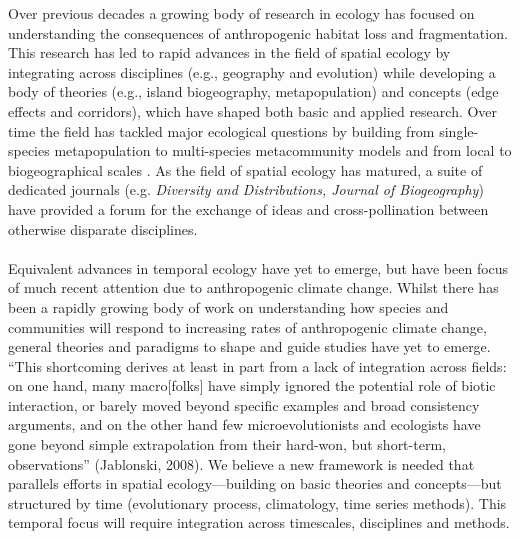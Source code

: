 \documentclass[11pt,a4paper]{article}
\begin{document}
\noindent Over previous decades a growing body of research in ecology has focused on understanding the consequences of anthropogenic habitat loss and fragmentation. This research has led to rapid advances in the field of spatial ecology by integrating across disciplines (e.g., geography and evolution) while developing a body of theories (e.g., island biogeography, metapopulation) and concepts (edge effects and corridors), which have shaped both basic and applied research. Over time the field has tackled major ecological questions by building from single-species metapopulation to multi-species metacommunity models \citep{Pillai2011} and from local to biogeographical scales \citep{bell2001}. As the field of spatial ecology has matured, a suite of dedicated journals  (e.g. \emph{Diversity and Distributions, Journal of Biogeography}) have provided a forum for the exchange of ideas and cross-pollination between otherwise disparate disciplines. \\
\\
Equivalent advances in temporal ecology have yet to emerge, but have been focus of much recent attention due to anthropogenic climate change. Whilst there has been a rapidly growing body of work on understanding how species and communities will respond to increasing rates of anthropogenic climate change, general theories and paradigms to shape and guide studies have yet to emerge. ``This shortcoming derives at least in
part from a lack of integration across fields: on one hand, many
macro[folks] have simply ignored the potential role of biotic
interaction, or barely moved beyond specific examples and broad
consistency arguments, and on the other hand few microevolutionists
and ecologists have gone beyond simple extrapolation from
their hard-won, but short-term, observations'' (Jablonski, 2008). We believe a new framework is needed that parallels efforts in spatial ecology---building on basic theories and concepts---but structured by time (evolutionary process, climatology, time series methods). This temporal focus will require integration across timescales, disciplines and methods. \\
\end{document}
